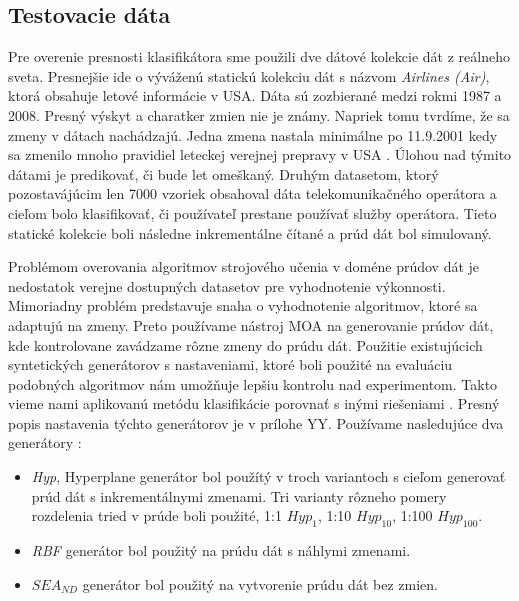 \subsection{Testovacie dáta}
Pre overenie presnosti klasifikátora sme použili dve dátové kolekcie dát z reálneho sveta. Presnejšie ide o výváženú statickú kolekciu dát s názvom \textit{Airlines (Air)}, ktorá obsahuje letové informácie v USA. Dáta sú zozbierané medzi rokmi 1987 a 2008. Presný výskyt a charatker zmien nie je známy. Napriek tomu tvrdíme, že sa zmeny v dátach nachádzajú. Jedna zmena nastala minimálne po 11.9.2001 kedy sa zmenilo mnoho pravidiel leteckej verejnej prepravy v USA \citep{brzezinski2014prequential, krawczyk2015one}. Úlohou nad týmito dátami je predikovať, či bude let omeškaný. Druhým datasetom, ktorý pozostavájúcim len 7000 vzoriek obsahoval dáta telekomunikačného operátora a cieľom bolo klasifikovať, či používateľ prestane používať služby operátora. Tieto statické kolekcie boli následne inkrementálne čítané a prúd dát bol simulovaný.
\par
Problémom overovania algoritmov strojového učenia v doméne prúdov dát je nedostatok verejne dostupných datasetov pre vyhodnotenie výkonnosti. Mimoriadny problém predstavuje snaha o vyhodnotenie algoritmov, ktoré sa adaptujú na zmeny. Preto používame nástroj MOA na generovanie prúdov dát, kde kontrolovane zavádzame rôzne zmeny do prúdu dát. Použitie existujúcich syntetických generátorov s nastaveniami, ktoré boli použité na evaluáciu podobných algoritmov nám umožňuje lepšiu kontrolu nad experimentom. Takto vieme nami aplikovanú metódu klasifikácie porovnať s inými riešeniami \citep{krawczyk2015one, brzezinski2014prequential}. Presný popis nastavenia týchto generátorov je v prílohe YY. Používame nasledujúce dva generátory \citep{bifet2010moa}:
\begin{itemize}
	\item \textit{Hyp}, Hyperplane generátor bol použítý v troch variantoch s cieľom generovať prúd dát s inkrementálnymi zmenami. Tri varianty rôzneho pomery rozdelenia tried v prúde boli použité, 1:1 $Hyp_1$, 1:10 $Hyp_10$, 1:100 $Hyp_100$.
	\item \textit{RBF} generátor bol použitý na prúdu dát s náhlymi zmenami.
	\item \textit{$SEA_{ND}$} generátor bol použitý na vytvorenie prúdu dát bez zmien.
\end{itemize}

